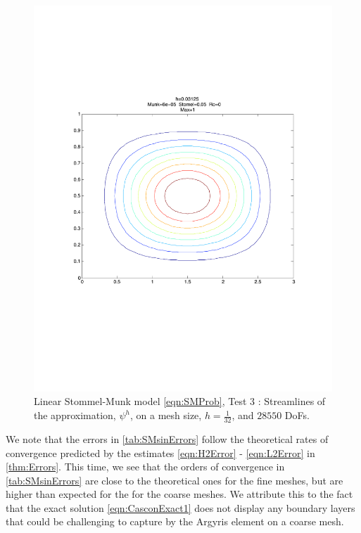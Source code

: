 \begin{figure}%
  \begin{center}
    \includegraphics[scale=0.5]{Figures/StommelMunk1.pdf}
    \caption{Linear Stommel-Munk model \eqref{eqn:SMProb}, Test 3 \cite{Cascon}:
    Streamlines of the approximation, $\psi^h$, on a mesh size,
    $h=\frac{1}{32}$, and $28550$ DoFs.}
    \label{fig:StommelMunkSin}
  \end{center}
\end{figure}

We note that the errors in \autoref{tab:SMsinErrors} follow the theoretical
rates of convergence predicted by the estimates \eqref{eqn:H2Error} -
\eqref{eqn:L2Error} in \autoref{thm:Errors}.  This time, we see that the orders
of convergence in \autoref{tab:SMsinErrors} are close to the theoretical ones
for the fine meshes, but are higher than expected for the for the coarse meshes.
We attribute this to the fact that the exact solution \eqref{eqn:CasconExact1}
does not display any boundary layers that could be challenging to capture by the
Argyris element on a coarse mesh.

